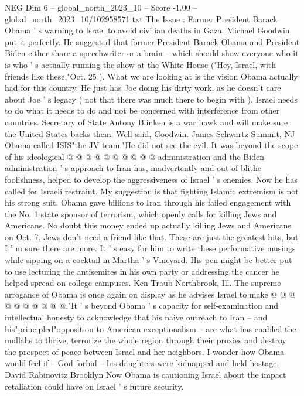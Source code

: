 \begin{textsample}{NEG Dim 6 – global\_north\_2023\_10 – Score -1.00 – global\_north\_2023\_10/102958571.txt}  \label{ex:f6_neg_249}
The Issue : Former President Barack Obama ' s warning to Israel to avoid civilian deaths in Gaza.
Michael Goodwin put it perfectly.
He suggested that former President Barack Obama and President Biden either share a speechwriter or a brain -- which should show everyone who it is who ' s actually running the show at the White House ("Hey, Israel, with friends like these,"Oct. 25 ).
What we are looking at is the vision Obama actually had for this country.
He just has Joe doing his dirty work, as he doesn't care about Joe ' s legacy ( not that there was much there to begin with ).
Israel needs to do what it needs to do and not be concerned with interference from other countries.
Secretary of State Antony Blinken is a war hawk and will make sure the United States backs them.
Well said, Goodwin.
James Schwartz Summit, NJ Obama called ISIS"the JV team."He did not see the evil.
It was beyond the scope of his ideological @ @ @ @ @ @ @ @ @ @ administration and the Biden administration ' s approach to Iran has, inadvertently and out of blithe foolishness, helped to develop the aggressiveness of Israel ' s enemies.
Now he has called for Israeli restraint.
My suggestion is that fighting Islamic extremism is not his strong suit.
Obama gave billions to Iran through his failed engagement with the No. 1 state sponsor of terrorism, which openly calls for killing Jews and Americans.
No doubt this money ended up actually killing Jews and Americans on Oct. 7.
Jews don't need a friend like that.
These are just the greatest hits, but I ' m sure there are more.
It ' s easy for him to write these performative musings while sipping on a cocktail in Martha ' s Vineyard.
His pen might be better put to use lecturing the antisemites in his own party or addressing the cancer he helped spread on college campuses.
Ken Traub Northbrook, Ill.
The supreme arrogance of Obama is once again on display as he advises Israel to make @ @ @ @ @ @ @ @ @ @."It ' s beyond Obama ' s capacity for self-examination and intellectual honesty to acknowledge that his naive outreach to Iran -- and his"principled"opposition to American exceptionalism -- are what has enabled the mullahs to thrive, terrorize the whole region through their proxies and destroy the prospect of peace between Israel and her neighbors.
I wonder how Obama would feel if -- God forbid -- his daughters were kidnapped and held hostage.
David Rabinovitz Brooklyn Now Obama is cautioning Israel about the impact retaliation could have on Israel ' s future security.

\end{textsample}
